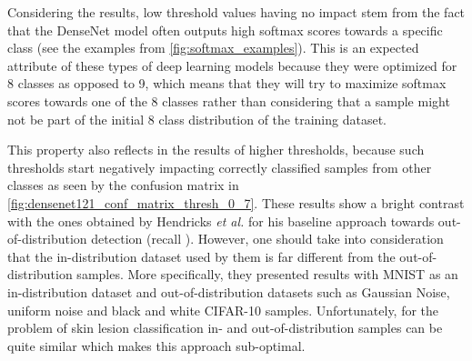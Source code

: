         Considering the results, low threshold values having no impact stem from the fact that the DenseNet model often outputs high softmax scores towards a specific class (see the examples from \autoref{fig:softmax_examples}). This is an expected attribute of these types of deep learning models because they were optimized for 8 classes as opposed to 9, which means that they will try to maximize softmax scores towards one of the 8 classes rather than considering that a sample might not be part of the initial 8 class distribution of the training dataset. \par
        
        This property also reflects in the results of higher thresholds, because such thresholds start negatively impacting correctly classified samples from other classes as seen by the confusion matrix in \autoref{fig:densenet121_conf_matrix_thresh_0_7}. These results show a bright contrast with the ones obtained by Hendricks \textit{et al.} \cite{Hendrycks2019} for his baseline approach towards out-of-distribution detection (recall ). However, one should take into consideration that the in-distribution dataset used by them is far different from the out-of-distribution samples. More specifically, they presented results with  \ac{MNIST} \cite{LeCun1998} as an in-distribution dataset and out-of-distribution datasets such as Gaussian Noise, uniform noise and black and white CIFAR-10 \cite{Krizhevskya} samples. Unfortunately, for the problem of skin lesion classification in- and out-of-distribution samples can be quite similar which makes this approach sub-optimal.
        

